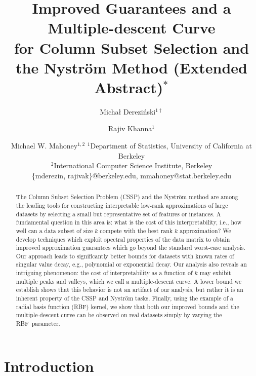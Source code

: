 \documentclass{article}
\title{Improved Guarantees and a Multiple-descent Curve\\
  for Column Subset Selection 
  and the Nystr\"om Method (Extended Abstract)$^*$}
\author{
Micha{\l } Derezi\'{n}ski$^{1\dagger}$
\and
{Rajiv Khanna}$^1$\and
Michael W. Mahoney$^{1,2}$
\affiliations
$^1$Department of Statistics,
  University of California at Berkeley\\
$^2$International Computer Science Institute, Berkeley \\
\emails
\{mderezin, rajivak\}@berkeley.edu,
mmahoney@stat.berkeley.edu
}
\begin{document}
\maketitle

\begin{abstract}
 The Column Subset Selection Problem (CSSP) and the Nystr\"om method
are among the leading tools for constructing interpretable low-rank
approximations of large datasets by selecting a small but
representative set of features or instances. 
A fundamental question in this area is: what is the cost of this
interpretability, i.e., how well can a data subset of
size $k$ compete with the best rank $k$ approximation?
We develop techniques which exploit spectral properties of the data
matrix to obtain improved approximation guarantees which go beyond the
standard worst-case analysis.
Our approach leads to significantly better bounds for datasets with
known rates of singular value decay, e.g., polynomial or exponential
decay.
Our analysis also reveals an intriguing phenomenon: the cost of
interpretability as a function of $k$ may exhibit multiple peaks and
valleys, which we call a multiple-descent curve.
A lower bound we establish shows that this behavior is not an artifact
of our analysis, but rather it is an inherent property of the CSSP and
Nystr\"om tasks.
Finally, using the example of a radial basis function (RBF)
kernel, we show that both our improved bounds and the multiple-descent
curve can be observed on real datasets simply by varying the
RBF~parameter.
\end{abstract}
\section{Introduction}
\label{s:intro}

{\renewcommand{\thefootnote}{\fnsymbol{footnote}}
  }
\end{document}
